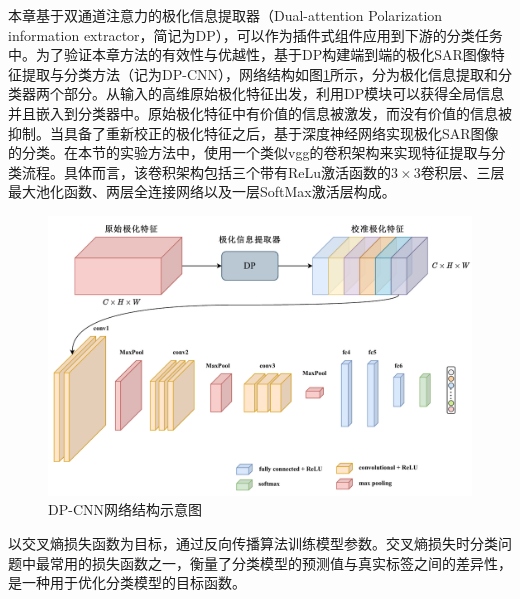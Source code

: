 
本章基于双通道注意力的极化信息提取器（Dual-attention Polarization information extractor，简记为DP），可以作为插件式组件应用到下游的分类任务中。为了验证本章方法的有效性与优越性，基于DP构建端到端的极化SAR图像特征提取与分类方法（记为DP-CNN），网络结构如图\ref{fig:DPCNN}所示，分为极化信息提取和分类器两个部分。从输入的高维原始极化特征出发，利用DP模块可以获得全局信息并且嵌入到分类器中。原始极化特征中有价值的信息被激发，而没有价值的信息被抑制。当具备了重新校正的极化特征之后，基于深度神经网络实现极化SAR图像的分类。在本节的实验方法中，使用一个类似vgg的卷积架构来实现特征提取与分类流程。具体而言，该卷积架构包括三个带有ReLu激活函数的$3\times 3$卷积层、三层最大池化函数、两层全连接网络以及一层SoftMax激活层构成。

\begin{figure}[ht!]
    \centering
    \includegraphics[width=14cm]{pic/chapter3/DPCNN.pdf}
    \caption{DP-CNN网络结构示意图}
    \label{fig:DPCNN}
\end{figure}


以交叉熵损失函数为目标，通过反向传播算法训练模型参数。交叉熵损失时分类问题中最常用的损失函数之一，衡量了分类模型的预测值与真实标签之间的差异性，是一种用于优化分类模型的目标函数。

